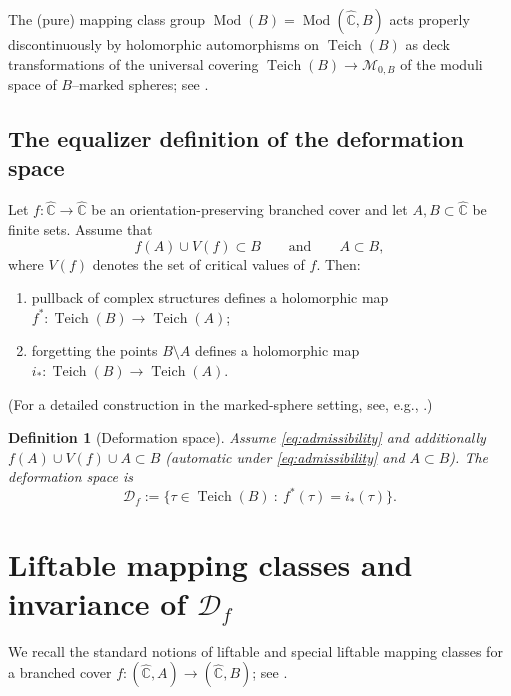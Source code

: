 \documentclass[11pt]{article}
\newtheorem{definition}[theorem]{Definition}
\DeclareMathOperator{\Teich}{Teich}
\DeclareMathOperator{\Mod}{Mod}
\begin{document}
The (pure) mapping class group $\Mod(B)=\Mod(\widehat{\mathbb C},B)$ acts properly discontinuously by holomorphic automorphisms on $\Teich(B)$ as deck transformations of the universal covering $\Teich(B)\to \mathcal M_{0,B}$ of the moduli space of $B$--marked spheres; see \cite[\S12]{FM12}.

\subsection{The equalizer definition of the deformation space}
Let $f:\widehat{\mathbb C}\to \widehat{\mathbb C}$ be an orientation-preserving branched cover and let $A,B\subset \widehat{\mathbb C}$ be finite sets. Assume that
\begin{equation}\label{eq:admissibility}
f(A)\cup V(f)\subset B
\qquad\text{and}\qquad
A\subset B,
\end{equation}
where $V(f)$ denotes the set of critical values of $f$. Then:
\begin{enumerate}
\item pullback of complex structures defines a holomorphic map $f^*:\Teich(B)\to \Teich(A)$;
\item forgetting the points $B\setminus A$ defines a holomorphic map $i_*:\Teich(B)\to \Teich(A)$.
\end{enumerate}
(For a detailed construction in the marked-sphere setting, see, e.g., \cite[\S2--\S3]{Koch10}.)

\begin{definition}[Deformation space]
Assume \eqref{eq:admissibility} and additionally $f(A)\cup V(f)\cup A\subset B$ (automatic under \eqref{eq:admissibility} and $A\subset B$). The deformation space is
\[
\mathcal D_f:=\{\tau\in \Teich(B)\ :\ f^*(\tau)=i_*(\tau)\}.
\]
\end{definition}

\section{Liftable mapping classes and invariance of $\mathcal D_f$}

We recall the standard notions of liftable and special liftable mapping classes for a branched cover $f:(\widehat{\mathbb C},A)\to (\widehat{\mathbb C},B)$; see \cite[\S3]{Koch10}.
\end{document}
